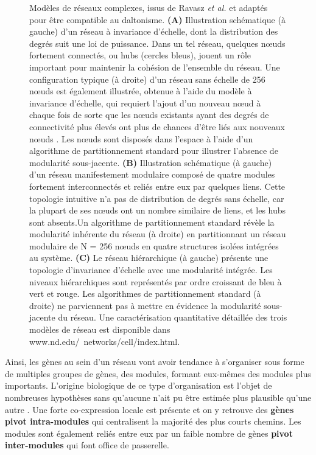 \begin{figure}[hp!]
    \caption[Modèles de réseaux complexes, issus de Ravasz \textit{et al.}]{Modèles de réseaux complexes, issus de Ravasz \textit{et al.} \cite{Ravasz2002} et adaptés pour être compatible au daltonisme. \textbf{(A)} Illustration schématique (à gauche) d'un réseau à invariance d'échelle, dont la distribution des degrés suit une loi de puissance. Dans un tel réseau, quelques nœuds fortement connectés, ou hubs (cercles bleus), jouent un rôle important pour maintenir la cohésion de l'ensemble du réseau. Une configuration typique (à droite) d'un réseau sans échelle de 256 nœuds est également illustrée, obtenue à l'aide du modèle à invariance d'échelle, qui requiert l'ajout d'un nouveau nœud à chaque fois de sorte que les nœuds existants ayant des degrés de connectivité plus élevés ont plus de chances d'être liés aux nouveaux nœuds \cite{Barabasi1999Oct}. Les nœuds sont disposés dans l'espace à l'aide d'un algorithme de partitionnement standard \cite{Batagelj1998} pour illustrer l'absence de modularité sous-jacente. \textbf{(B)} Illustration schématique (à gauche) d'un réseau manifestement modulaire composé de quatre modules fortement interconnectés et reliés entre eux par quelques liens. Cette topologie intuitive n'a pas de distribution de degrés sans échelle, car la plupart de ses nœuds ont un nombre similaire de liens, et les hubs sont absents.Un algorithme de partitionnement standard révèle la modularité inhérente du réseau (à droite) en partitionnant un réseau modulaire de N = 256 nœuds en quatre structures isolées intégrées au système. \textbf{(C)} Le réseau hiérarchique (à gauche) présente une topologie d'invariance d'échelle avec une modularité intégrée. Les niveaux hiérarchiques sont représentés par ordre croissant de bleu à vert et rouge. Les algorithmes de partitionnement standard (à droite) ne parviennent pas à mettre en évidence la modularité sous-jacente du réseau. Une caractérisation quantitative détaillée des trois modèles de réseau est disponible dans www.nd.edu/~networks/cell/index.html\footnotemark.}
    \label{fig:ravasz_hierarchical_clustering}
\end{figure}

Ainsi, les gènes au sein d'un réseau vont avoir tendance à s'organiser sous forme de multiples groupes de gènes, des \glspl{module}, formant eux-mêmes des modules plus importants. L'origine biologique de ce type d'organisation est l'objet de nombreuses hypothèses sans qu'aucune n'ait pu être estimée plus plausible qu'une autre \cite{Lorenz2011}. Une forte co-expression locale est présente et on y retrouve des \textbf{gènes pivot intra-modules} qui centralisent la majorité des plus courts chemins. Les modules sont également reliés entre eux par un faible nombre de gènes \textbf{pivot inter-modules} qui font office de passerelle.

